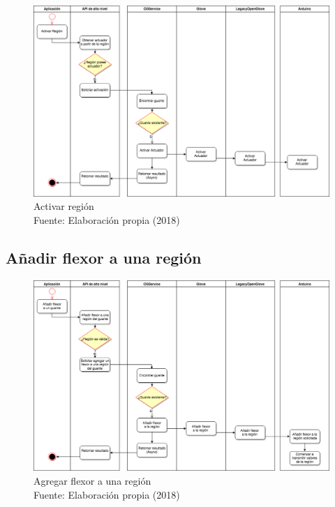 \begin{figure}[H]
  \begin{center} 
   	\includegraphics[width=1.0\textwidth]{images/chapter04/ActivityDiagrams-RegionActivation.png} 
    \caption[Activar región]{Activar región \\Fuente: Elaboración propia (2018)}
    \label{fig:activity-diagrams02-RegionActivation}
  \end{center}
\end{figure}

\subsection{Añadir flexor a una región}

\begin{figure}[H]
  \begin{center} 
   	\includegraphics[width=1.0\textwidth]{images/chapter04/ActivityDiagrams-AddFlexorToRegion.png} 
    \caption[Agregar flexor a una región]{Agregar flexor a una región \\Fuente: Elaboración propia (2018)}
    \label{fig:activity-diagrams03-AddFlexorToRegion}
  \end{center}
\end{figure}

